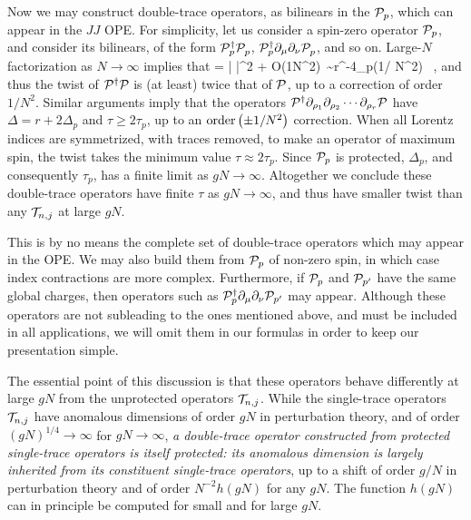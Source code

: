   Now we may construct double-trace operators, as bilinears in the
${\cal P }_p$, which can appear in the $JJ$ OPE.  For simplicity, let us
consider a spin-zero operator ${\cal P }_p$, and consider its bilinears, of
the form $\KK_p^{\dagger}\KK_p^{\vphantom\dagger}$, $\KK_p^{\dagger}
\partial_\mu\partial_\nu\KK_p^{\vphantom\dagger}$, and so
on. Large-$N$ factorization as $N\to\infty$ implies that
%
=
\left| \right|^2
+ O\left({1\over N^2}\right)\
\sim r^{-4\Delta_p\left(1/ N^2\right)  }\ ,
\ee
%
and thus the twist of ${\cal P }^\dagger {\cal P }$ is (at least) twice that of
${\cal P }$, up to a correction of order $1/N^2$.  Similar arguments imply
that the operators ${\cal P }^\dagger \partial_{\rho_1}\partial_{\rho_2}
\cdots\partial_{\rho_r}{\cal P }$ have $\Delta = r + 2\Delta_p$ and
$\tau\geq 2\tau_p$, up to an ${\rm order}\left(\pm{1/ N^2}\right)$
correction.  When all Lorentz indices are symmetrized, with traces
removed, to make an operator of maximum spin, the twist takes the
minimum value $\tau \approx 2\tau_p$. Since ${\cal P }_p$ is protected,
$\Delta_p$, and consequently $\tau_p$, has a finite limit as $g
N\to\infty$. Altogether we conclude these double-trace operators have
finite $\tau$ as $gN\to\infty$, and thus have smaller twist than any
${\cal T}_{n,j}$ at large $gN$.

This is by no means the complete set of double-trace operators which
may appear in the OPE.  We may also build them from
${\cal P }_p$ of non-zero spin, in which case index contractions are more
complex.  Furthermore, if ${\cal P }_p$ and ${\cal P }_{p'}$ have the same global
charges, then operators such as
${\cal P }_p^{\dagger}\partial_{\mu}\partial_\nu{\cal P }_{p'}$ may
appear.  Although these operators are not subleading to the ones
mentioned above, and must be included in all applications, we will
omit them in our formulas in order to keep our presentation simple.


    The essential point of this discussion is that these operators
behave differently at large $gN$ from the unprotected operators
${\cal T}_{n,j}$.  While the single-trace operators ${\cal T}_{n,j}$ have
anomalous dimensions of order $g N$ in perturbation theory, and of
order $(g N)^{1/4} \to \infty$ for $g N\to\infty$, {\it a double-trace
operator constructed from protected single-trace operators is itself
protected: its anomalous dimension is largely inherited from its
constituent single-trace operators}, up to a shift of order $g /N$ in
perturbation theory and of order $N^{-2}h(g N)$ for any $g N$. The
function $h(g N)$ can in principle be computed for small and for large
$g N$.

